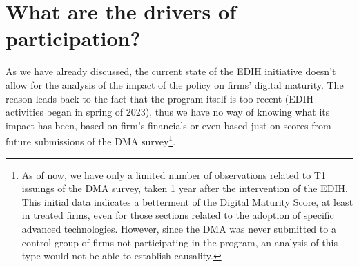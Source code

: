 \documentclass[12pt]{report}
\begin{document}











\newpage


\newpage
\chapter{What are the drivers of participation?}
\par As we have already discussed, the current state of the EDIH initiative doesn't allow for the analysis of the impact of the policy on firms' digital maturity. The reason leads back to the fact that the program itself is too recent (EDIH activities began in spring of 2023), thus we have no way of knowing what its impact has been, based on firm's financials or even based just on scores from future submissions of the DMA survey\footnote{As of now, we have only a limited number of observations related to T1 issuings of the DMA survey, taken 1 year after the intervention of the EDIH. This initial data indicates a betterment of the Digital Maturity Score, at least in treated firms, even for those sections related to the adoption of specific advanced technologies. However, since the DMA was never submitted to a control group of firms not participating in the program, an analysis of this type would not be able to establish causality.}.
\end{document}
